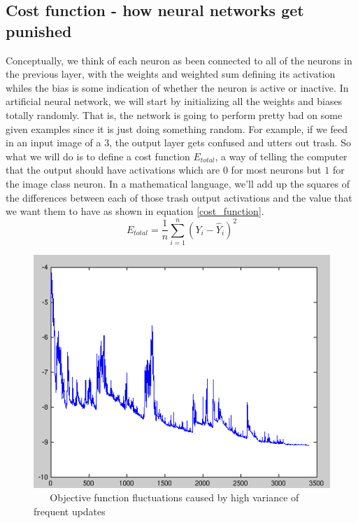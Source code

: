 \documentclass[master]{thesis-uestc}
\begin{document}
\subsection{Cost function - how neural networks get punished}
Conceptually, we think of each neuron as been connected to all of the neurons in the previous layer, with the weights and weighted sum defining its activation whiles the bias is some indication of whether the neuron is active or inactive. In artificial neural network, we will start by initializing all the weights and biases totally randomly. That is, the network is going to perform pretty bad on some given examples since it is just doing something random. For example, if we feed in an input image of a $3$, the output layer gets confused and utters out trash. So what we will do is to define a cost function $E_{total}$, a way of telling the computer that the output should have activations which are $0$ for most neurons but $1$ for the image class neuron. In a mathematical language, we'll add up the squares of the differences between each of those trash output activations and the value that we want them to have as shown in equation \ref{cost_function}.
\begin{equation}
    E_{total} = \frac{1}{n}\sum_{i=1}^{n} (Y_i - \hat{Y}_i)^2
    \label{cost_function}
\end{equation}

\begin{figure}[ht]
\includegraphics[width=5in]{pic/fluctuation.png}
\caption{\,\,\,\,\,\,\,\,\,\,Objective function fluctuations caused by high variance of frequent updates}
\label{SGD}
\end{figure}
\end{document}
